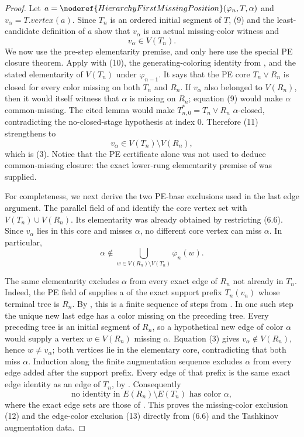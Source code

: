 \begin{proof}
Let $a=\noderef{HierarchyFirstMissingPosition}
(\varphi_n,T,\alpha)$ and $v_\alpha=T.\mathit{vertex}(a)$.  Since
$T_n$ is an ordered initial segment of $T$, (9) and the least-candidate
definition of $a$ show that $v_\alpha$ is an actual missing-color witness
and
\[
                              v_\alpha\in V(T_n).                \tag{11}
\]
We now use the pre-step elementarity premise, and only here use the
special PE closure theorem.  Apply
 with (10), the generating-coloring
identity from , and the stated
elementarity of $V(T_n)$ under $\varphi_{n-1}$.  It says that the PE core
$T_n\vee R_n$ is closed for every color missing on both $T_n$ and
$R_n$.  If $v_\alpha$ also belonged to $V(R_n)$, then it would itself
witness that $\alpha$ is missing on $R_n$; equation (9) would make
$\alpha$ common-missing.  The cited lemma would make
$T_{n,0}^{*}=T_n\vee R_n$ $\alpha$-closed, contradicting the
no-closed-stage hypothesis at index $0$.  Therefore (11) strengthens to
\[
                        v_\alpha\in V(T_n)\setminus V(R_n),
\]
which is (3).  Notice that the PE certificate alone was not used to
deduce common-missing closure: the exact lower-rung elementarity premise
of  was supplied.

For completeness, we next derive the two PE-base exclusions used in the
last edge argument.  The parallel field of
 and  identify the
core vertex set with $V(T_n)\cup V(R_n)$.  Its elementarity was already
obtained by restricting (6.6).  Since $v_\alpha$ lies in this core and
misses $\alpha$, no different core vertex can miss $\alpha$.  In
particular,
\[
 \alpha\notin
 \bigcup_{w\in V(R_n)\setminus V(T_n)}
          \overline\varphi_n(w).                                \tag{12}
\]

The same elementarity excludes $\alpha$ from every exact edge of
$R_n$ not already in $T_n$.  Indeed, the PE field of
 supplies a
 of the exact support prefix $T_n(v_n)$ whose
terminal tree is $R_n$.  By
, this is a finite sequence of
steps from .  In one such step the unique
new last edge has a color missing on the preceding tree.  Every preceding
tree is an initial segment of $R_n$, so a hypothetical new edge of color
$\alpha$ would supply a vertex $w\in V(R_n)$ missing $\alpha$.
Equation (3) gives $v_\alpha\notin V(R_n)$, hence $w\ne v_\alpha$;
both vertices lie in the elementary core, contradicting that both miss
$\alpha$.  Induction along the finite augmentation sequence excludes
$\alpha$ from every edge added after the support prefix.  Every edge of
that prefix is the same exact edge identity as an edge of $T_n$, by
.  Consequently
\[
 \text{no identity in }E(R_n)\setminus E(T_n)
       \text{ has color }\alpha,                               \tag{13}
\]
where the exact edge sets are those of
.
This proves the missing-color exclusion (12) and the edge-color exclusion
(13) directly from (6.6) and the Tashkinov augmentation data.


\end{proof}
